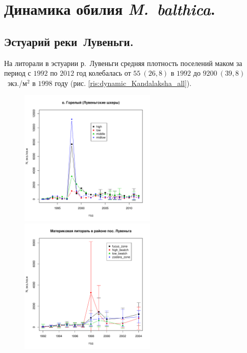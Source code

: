\documentclass[12pt, a4paper]{disser}
\begin{document}
	\section{Динамика обилия {\it M.~balthica}.}

		\subsection{Эстуарий реки~Лувеньги.}


На литорали в эстуарии р.~Лувеньги средняя плотность поселений маком за период с $1992$ по $2012$ год колебалась от $55~(26,8)$ в $1992$ до $9200~(39,8)$~экз./м$^2$ в $1998$ году (рис. \ref{ris:dynamic_Kandalaksha_all}). 
	\begin{figure}[h]
	
	\begin{minipage}[b]{.46\linewidth}
	\begin{center}
		\includegraphics[width=65mm]{../White_Sea/Luvenga_Goreliy/N_dynamic.pdf}
	\end{center}
	\end{minipage}
	\hfil %
	\begin{minipage}[b]{.46\linewidth}
	\begin{center}
		\includegraphics[width=65mm]{../White_Sea//Luvenga_II_razrez/N_dynamic.pdf}
	\end{center}
	\end{minipage}


\end{figure}
\end{document}
